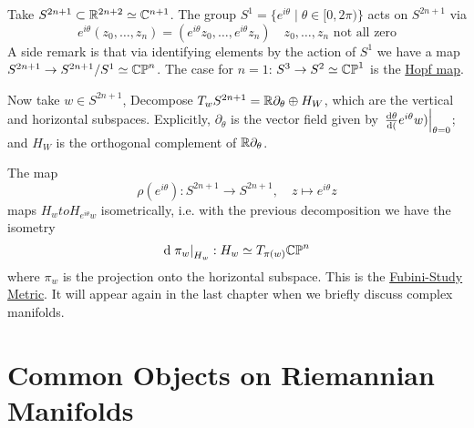 \documentclass{article}
\begin{document}
\begin{example}
    Take $S^{2n+1} \subset \mathbb{R}^{2n+2} \simeq \mathbb{C}^{n+1}$. The group $S^1 = \{ e^{i \theta} \mid \theta \in [0, 2 \pi) \}$ acts on $S^{2n+1}$ via
    \[
        e^{i \theta} (z_0, \dots, z_n) = (e^{i \theta} z_0, \dots, e^{i \theta} z_n) \quad \text{$z_0, \dots, z_n$ not all zero}
    \]
    A side remark is that via identifying elements by the action of $S^1$ we have a map $S^{2n+1} \to S^{2n+1}/S^1 \simeq \mathbb{CP}^n$. The case for $n = 1$: $S^3 \to S^2 \simeq \mathbb{CP}^1$ is the \underline{Hopf map}. 

    Now take $w \in S^{2n+1}$, Decompose $T_w S^{2n+1} = \mathbb{R} \partial_{\theta} \oplus H_W$, which are the vertical and horizontal subspaces. Explicitly, $\partial_{\theta}$ is the vector field given by $\left.\frac{\mathrm{d} \theta}{\mathrm{d} (}e^{i \theta} w)\right|_{\theta = 0}$; and $H_W$ is the orthogonal complement of $\mathbb{R} \partial_{\theta}$. 

    The map 
    \[
        \rho(e^{i \theta}): S^{2n+1} \to S^{2n+1}, \quad z \mapsto e^{i \theta}z
    \]
    maps $H_w to H_{e^{i \theta}w}$ isometrically, i.e. with the previous decomposition we have the isometry
    \[
        \mathrm{d} \left.\pi_w\right|_{H_w} : H_w \simeq T_{\pi(w)} \mathbb{CP}^n
    \]
    where $\pi_w$ is the projection onto the horizontal subspace. This is the \underline{Fubini-Study Metric}. It will appear again in the last chapter when we briefly discuss complex manifolds.
\end{example}

\section{Common Objects on Riemannian Manifolds}
\end{document}
